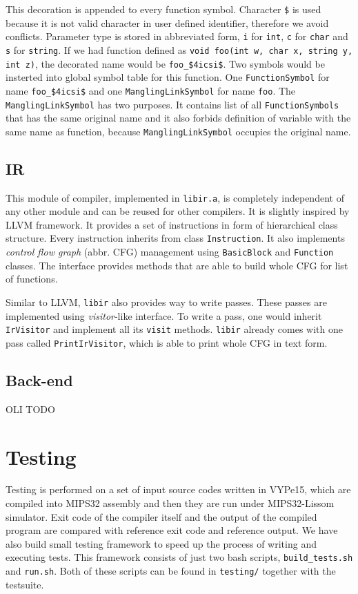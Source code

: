 \documentclass[12pt]{article}
\begin{document}
This decoration is appended to every function symbol. Character \texttt{\$} is used because it is not valid character in user defined identifier, therefore
we avoid conflicts. Parameter type is stored in abbreviated form, \texttt{i} for \texttt{int}, \texttt{c} for \texttt{char} and \texttt{s} for \texttt{string}.
If we had function defined as \texttt{void foo(int w, char x, string y, int z)}, the decorated name would be \texttt{foo\_\$4icsi\$}.
Two symbols would be insterted into global symbol table for this function. One \texttt{FunctionSymbol} for name \texttt{foo\_\$4icsi\$} and
one \texttt{ManglingLinkSymbol} for name \texttt{foo}. The \texttt{ManglingLinkSymbol} has two purposes. It contains list of all \texttt{FunctionSymbols} that has the same
original name and it also forbids definition of variable with the same name as function, because \texttt{ManglingLinkSymbol} occupies the original name.

\subsection{IR}
This module of compiler, implemented in \texttt{libir.a}, is completely independent of any other module and can be reused for other compilers. It is slightly
inspired by LLVM framework. It provides a set of instructions in form of hierarchical class structure. Every instruction inherits from class \texttt{Instruction}.
It also implements \emph{control flow graph} (abbr. CFG) management using \texttt{BasicBlock} and \texttt{Function} classes. The interface provides methods
that are able to build whole CFG for list of functions.

Similar to LLVM, \texttt{libir} also provides way to write passes. These passes are implemented using \emph{visitor}-like interface. To write a pass, one would
inherit \texttt{IrVisitor} and implement all its \texttt{visit} methods. \texttt{libir} already comes with one pass called \texttt{PrintIrVisitor}, which
is able to print whole CFG in text form.

\subsection{Back-end}
OLI TODO

\section{Testing}
Testing is performed on a set of input source codes written in VYPe15, which are compiled into MIPS32 assembly and then they are run
under MIPS32-Lissom simulator. Exit code of the compiler itself and the output of the compiled program are compared with reference
exit code and reference output. We have also build small testing framework to speed up the process of writing and executing tests.
This framework consists of just two bash scripts, \texttt{build\_tests.sh} and \texttt{run.sh}. Both of these scripts can be found in \texttt{testing/}
together with the testsuite.
\end{document}
